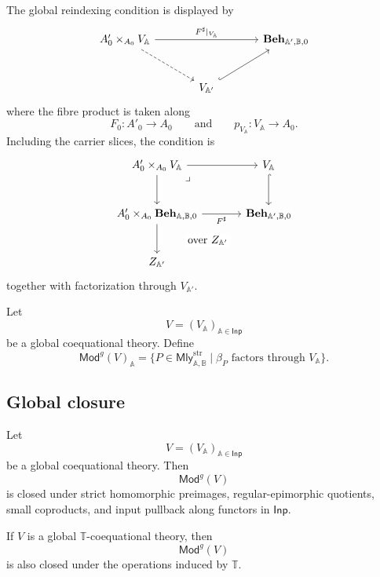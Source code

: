 The global reindexing condition is displayed by
\[
\begin{tikzcd}[column sep=large, row sep=large]
    A'_0\times_{A_0}V_{\mathbb A}
        \arrow[rr, "{F^\sharp|_{V_{\mathbb A}}}"]
        \arrow[dr, dashed]
    &&
    \mathbf{Beh}_{\mathbb A',\mathbb B,0}
    \\
    &
    V_{\mathbb A'}
        \arrow[ur, hook]
    &
\end{tikzcd}
\]
where the fibre product is taken along
\[
    F_0:A'_0\to A_0
    \qquad\text{and}\qquad
    p_{V_{\mathbb A}}:V_{\mathbb A}\to A_0.
\]
Including the carrier slices, the condition is
\[
\begin{tikzcd}[column sep=large, row sep=large]
    A'_0\times_{A_0}V_{\mathbb A}
        \arrow[r]
        \arrow[d]
        \arrow[dr, phantom, "\lrcorner", very near start]
    &
    V_{\mathbb A}
        \arrow[d, hook]
    \\
    A'_0\times_{A_0}\mathbf{Beh}_{\mathbb A,\mathbb B,0}
        \arrow[r, "F^\sharp"']
        \arrow[d]
    &
    \mathbf{Beh}_{\mathbb A',\mathbb B,0}
    \\
    Z_{\mathbb A'}
        \arrow[ur, phantom, "\text{over }Z_{\mathbb A'}" description]
    &
\end{tikzcd}
\]
together with factorization through \(V_{\mathbb A'}\).

\begin{definition}
\label{def:global-models}
    Let
    \[
        V=(V_{\mathbb A})_{\mathbb A\in\mathsf{Inp}}
    \]
    be a global coequational theory. Define
    \[
        \mathsf{Mod}^{g}(V)_{\mathbb A}
        =
        \{P\in\mathsf{Mly}^{\mathrm{str}}_{\mathbb A,\mathbb B}
          \mid
          \beta_P\text{ factors through }V_{\mathbb A}\}.
    \]
\end{definition}

\subsection{Global closure}
\label{subsec:global-coequational-closure}

\begin{theorem}
\label{thm:global-coequational-closure}
    Let
    \[
        V=(V_{\mathbb A})_{\mathbb A\in\mathsf{Inp}}
    \]
    be a global coequational theory. Then
    \[
        \mathsf{Mod}^{g}(V)
    \]
    is closed under strict homomorphic preimages, regular-epimorphic quotients,
    small coproducts, and input pullback along functors in \(\mathsf{Inp}\).

    If \(V\) is a global \(\mathbb T\)-coequational theory, then
    \[
        \mathsf{Mod}^{g}(V)
    \]
    is also closed under the operations induced by \(\mathbb T\).
\end{theorem}

